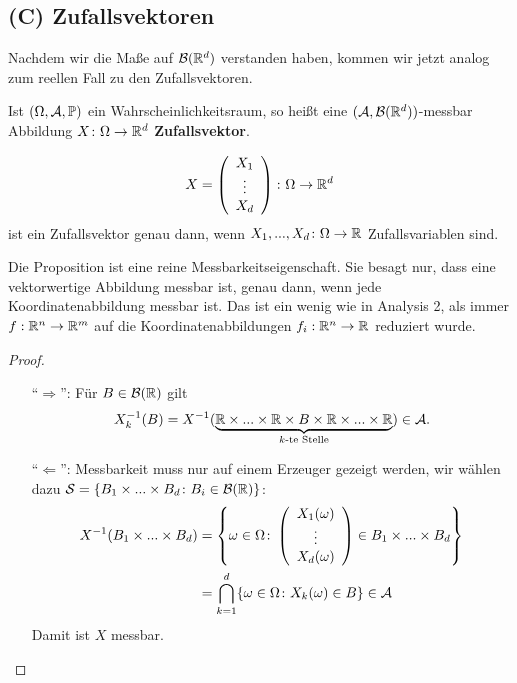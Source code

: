 \subsection*{(C) Zufallsvektoren}
Nachdem wir die Ma\ss e auf $\mathcal B(\mathbb{R}^d)$ verstanden haben, kommen wir jetzt analog zum reellen Fall zu den Zufallsvektoren.
\begin{deff}
	Ist $(\Omega, \mathcal{A}, \mathbb{P})$ ein Wahrscheinlichkeitsraum, so heißt eine $(\mathcal{A}, \mathcal{B}(\mathbb{R}^d))$-messbar Abbildung $X \colon \Omega \to \mathbb{R}^d$ \textbf{Zufallsvektor}.
\end{deff}

\begin{prop}\label{zweiInterpr}
	\[ X =\left(\begin{array}{c} X_1 \\ \vdots \\ X_d\end{array}\right)\colon \Omega \to \mathbb{R}^d \] ist ein Zufallsvektor genau dann, wenn $X_1,...,X_d \colon \Omega \to \mathbb{R}$ Zufallsvariablen sind.
\end{prop}
Die Proposition ist eine reine Messbarkeitseigenschaft. Sie besagt nur, dass eine vektorwertige Abbildung messbar ist, genau dann, wenn jede Koordinatenabbildung messbar ist. Das ist ein wenig wie in Analysis 2, als immer $f:\mathbb{R}^n\to \mathbb{R}^m$ auf die Koordinatenabbildungen $f_i:\mathbb{R}^n\to \mathbb{R}$ reduziert wurde.
\begin{proof}
	\begin{itemize}
		\item[\enquote{$\Rightarrow$}:] 	Für $B \in \mathcal{B}(\mathbb{R})$ gilt 
\[ X_k^{-1} (B) = X^{-1}(\underbrace{\mathbb{R} \times ... \times \mathbb{R} \times B \times \mathbb{R} \times ... \times \mathbb{R}}_{k\text{-te Stelle}}) \in \mathcal A. \]
		\item[\enquote{$\Leftarrow$}:] Messbarkeit muss nur auf einem Erzeuger gezeigt werden, wir wählen dazu $\mathcal{S} = \{ B_1 \times ... \times B_d\colon B_i \in \mathcal{B}(\mathbb{R}) \}$:
		\begin{align*}
			X^{-1}(B_1 \times ... \times B_d) &= \left\{ \omega\in \Omega\colon 
			\left(\begin{array}{c} X_1(\omega)\\\vdots\\ X_d(\omega)\end{array}\right) \in B_1 \times ... \times B_d \right\} \\
			&= \bigcap_{k=1}^{d} \{ \omega \in \Omega \colon X_k(\omega) \in B \} \in \mathcal{A} 
		\end{align*}
		Damit ist $X$ messbar.
	\end{itemize}
\end{proof}

